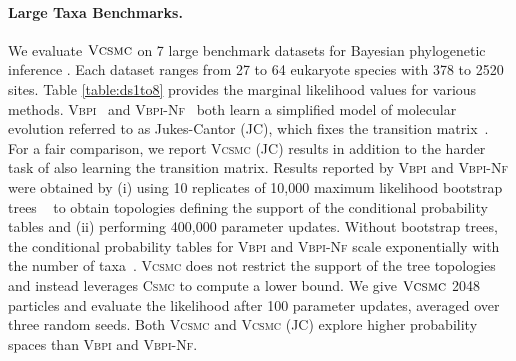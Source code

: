 \documentclass[accepted]{uai2021} %
\theoremstyle{definition}
\begin{document}
\paragraph{Large Taxa Benchmarks.} 
We evaluate $\textsc{Vcsmc}$ on 7 large benchmark datasets for Bayesian phylogenetic inference \citep{10.1093/oxfordjournals.molbev.a040628, Garey1996, 10.1080/10635150390235557, doi:10.1080/15572536.2004.11833059, lakner, doi:10.1080/00275514.2001.12063167,  doi:10.1080/00275514.2001.12061283}. Each dataset ranges from 27 to 64 eukaryote species with 378 to 2520 sites. Table \ref{table:ds1to8} provides the marginal likelihood values for various methods. \textsc{Vbpi}~\citep{zhang2018variational} and \textsc{Vbpi-Nf}~\citep{zhang2020improved} both learn a simplified model of molecular evolution referred to as Jukes-Cantor (JC), which fixes the transition matrix~\citep{JUKES196921}. For a fair comparison, we report \textsc{Vcsmc} (JC) results in addition to the harder task of also learning the transition matrix. Results reported by \textsc{Vbpi} and \textsc{Vbpi-Nf} were obtained by (i) using 10 replicates of 10,000 maximum likelihood bootstrap trees ~\citep{10.1093/molbev/mst024} to obtain topologies defining the support of the conditional probability tables and (ii) performing 400,000 parameter updates. Without bootstrap trees, the conditional probability tables for \textsc{Vbpi} and \textsc{Vbpi-Nf} scale exponentially with the number of taxa~\citep{zhang2018variational}. \textsc{Vcsmc} does not restrict the support of the tree topologies and instead leverages \textsc{Csmc} to compute a lower bound.  We give $\textsc{Vcsmc}$ 2048 particles and evaluate the likelihood after 100 parameter updates, averaged over three random seeds. Both \textsc{Vcsmc} and \textsc{Vcsmc} (JC) explore higher probability spaces than \textsc{Vbpi} and \textsc{Vbpi-Nf}.%
\end{document}
